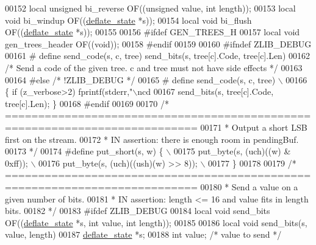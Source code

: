 \begin{DoxyCode}
00152 local \textcolor{keywordtype}{unsigned} bi\_reverse OF((\textcolor{keywordtype}{unsigned} value, \textcolor{keywordtype}{int} length));
00153 local \textcolor{keywordtype}{void} bi\_windup      OF((\hyperlink{structinternal__state}{deflate\_state} *s));
00154 local \textcolor{keywordtype}{void} bi\_flush       OF((\hyperlink{structinternal__state}{deflate\_state} *s));
00155 
00156 \textcolor{preprocessor}{#ifdef GEN\_TREES\_H}
00157 local \textcolor{keywordtype}{void} gen\_trees\_header OF((\textcolor{keywordtype}{void}));
00158 \textcolor{preprocessor}{#endif}
00159 
00160 \textcolor{preprocessor}{#ifndef ZLIB\_DEBUG}
00161 \textcolor{preprocessor}{#  define send\_code(s, c, tree) send\_bits(s, tree[c].Code, tree[c].Len)}
00162    \textcolor{comment}{/* Send a code of the given tree. c and tree must not have side effects */}
00163 
00164 \textcolor{preprocessor}{#else }\textcolor{comment}{/* !ZLIB\_DEBUG */}\textcolor{preprocessor}{}
00165 \textcolor{preprocessor}{#  define send\_code(s, c, tree) \(\backslash\)}
00166 \textcolor{preprocessor}{     \{ if (z\_verbose>2) fprintf(stderr,"\(\backslash\)ncd %
00167 \textcolor{preprocessor}{       send\_bits(s, tree[c].Code, tree[c].Len); \}}
00168 \textcolor{preprocessor}{#endif}
00169 
00170 \textcolor{comment}{/* ===========================================================================}
00171 \textcolor{comment}{ * Output a short LSB first on the stream.}
00172 \textcolor{comment}{ * IN assertion: there is enough room in pendingBuf.}
00173 \textcolor{comment}{ */}
00174 \textcolor{preprocessor}{#define put\_short(s, w) \{ \(\backslash\)}
00175 \textcolor{preprocessor}{    put\_byte(s, (uch)((w) & 0xff)); \(\backslash\)}
00176 \textcolor{preprocessor}{    put\_byte(s, (uch)((ush)(w) >> 8)); \(\backslash\)}
00177 \textcolor{preprocessor}{\}}
00178 
00179 \textcolor{comment}{/* ===========================================================================}
00180 \textcolor{comment}{ * Send a value on a given number of bits.}
00181 \textcolor{comment}{ * IN assertion: length <= 16 and value fits in length bits.}
00182 \textcolor{comment}{ */}
00183 \textcolor{preprocessor}{#ifdef ZLIB\_DEBUG}
00184 local \textcolor{keywordtype}{void} send\_bits      OF((\hyperlink{structinternal__state}{deflate\_state} *s, \textcolor{keywordtype}{int} value, \textcolor{keywordtype}{int} length));
00185 
00186 local \textcolor{keywordtype}{void} send\_bits(s, value, length)
00187     \hyperlink{structinternal__state}{deflate\_state} *s;
00188     \textcolor{keywordtype}{int} value;  \textcolor{comment}{/* value to send */}
}
\end{DoxyCode}
